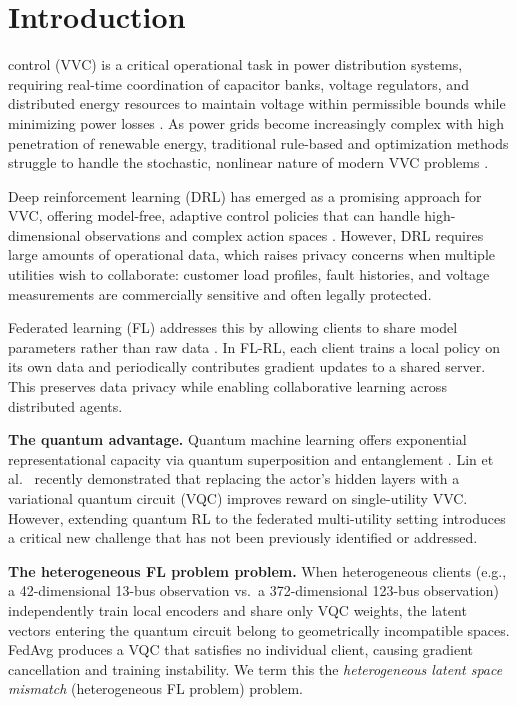 \documentclass[journal]{IEEEtran}
\begin{document}
\section{Introduction}

 control (VVC) is a critical operational task
in power distribution systems, requiring real-time coordination of
capacitor banks, voltage regulators, and distributed energy resources
to maintain voltage within permissible bounds while minimizing power losses
\cite{lin2025qesac}. As power grids become increasingly complex with
high penetration of renewable energy, traditional rule-based and optimization
methods struggle to handle the stochastic, nonlinear nature of modern VVC
problems \cite{lee2022graph}.

Deep reinforcement learning (DRL) has emerged as a promising approach for
VVC, offering model-free, adaptive control policies that can handle
high-dimensional observations and complex action spaces
\cite{lin2025qesac, lee2022graph}. However, DRL requires large amounts of
operational data, which raises privacy concerns when multiple utilities wish
to collaborate: customer load profiles, fault histories, and voltage
measurements are commercially sensitive and often legally protected.

Federated learning (FL) addresses this by allowing clients to share
model parameters rather than raw data \cite{mcmahan2017fedavg}.
In FL-RL, each client trains a local policy on its own data and
periodically contributes gradient updates to a shared server.
This preserves data privacy while enabling collaborative learning
across distributed agents.

\textbf{The quantum advantage.} Quantum machine learning offers exponential
representational capacity via quantum superposition and entanglement
\cite{biamonte2017qml}. Lin et al.\ \cite{lin2025qesac} recently demonstrated
that replacing the actor's hidden layers with a variational quantum circuit
(VQC) improves reward on single-utility VVC. However, extending quantum RL
to the federated multi-utility setting introduces a critical new challenge
that has not been previously identified or addressed.

\textbf{The heterogeneous FL problem problem.} When heterogeneous clients (e.g., a 42-dimensional
13-bus observation vs.\ a 372-dimensional 123-bus observation) independently
train local encoders and share only VQC weights, the latent vectors entering
the quantum circuit belong to geometrically incompatible spaces.
FedAvg produces a VQC that satisfies no individual client, causing gradient
cancellation and training instability. We term this the
\textit{heterogeneous latent space mismatch} (heterogeneous FL problem) problem.
\end{document}
